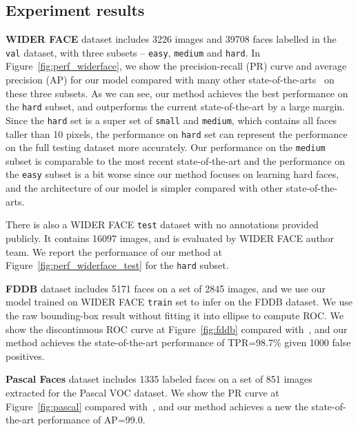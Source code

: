 \documentclass[10pt,twocolumn,letterpaper]{article}
\begin{document}
\subsection{Experiment results}
\vspace{1ex}\noindent \textbf{WIDER FACE}
dataset includes 3226 images and 39708 faces labelled in the \texttt{val} dataset, with three subsets --
\texttt{easy}, \texttt{medium} and \texttt{hard}. In Figure~\ref{fig:perf_widerface}, we show the precision-recall (PR) curve and average precision (AP) for
our model compared with many other state-of-the-arts~\cite{BaiFindingTF,cai2016unified,najibi2017ssh,ohn2016boost,Tang_2018_ECCV,wang2017facercnn,wang2017face,wang2017detecting,wang2017rfcn,yang2014aggregate,yang2015facial,yang2016wider,yang2017face,zhang2018face,zhang2016joint,zhang2017s,zhu2018seeing,zhu2017cms} on these three subsets.
As we can see, our method achieves the best performance on the \texttt{hard} subset, and outperforms
the current state-of-the-art by a large margin.
Since the \texttt{hard} set is a super set of \texttt{small} and
\texttt{medium}, which contains all faces taller than 10 pixels, the performance
on \texttt{hard} set can represent the performance on the full testing
dataset more accurately.
Our performance on the \texttt{medium} subset is comparable to the
most recent state-of-the-art and the performance on the \texttt{easy} subset is a bit worse since our
method focuses on learning hard faces, and the architecture of our model
is simpler compared with other state-of-the-arts.

There is also a WIDER FACE \texttt{test} dataset with no annotations provided publicly. It contains 16097 images, and
is evaluated by WIDER FACE author team. We report the performance of our method at Figure~\ref{fig:perf_widerface_test} for the \texttt{hard} subset.

\vspace{1ex} \noindent \textbf{FDDB}
 dataset includes 5171 faces on a set of 2845 images, and we use our model trained on WIDER FACE \texttt{train} set to infer
on the FDDB dataset. We use the raw bounding-box result without fitting it into ellipse to
compute ROC.
We show the discontinuous ROC curve at Figure~\ref{fig:fddb} compared with~\cite{li2013learning,mathias2014face,shen2013detecting,Tang_2018_ECCV,viola2004robust,yan2014face,zhang2018face,zhang2017s,zhu2012face}, and our method achieves
the state-of-the-art performance of TPR=98.7\% given 1000 false positives.

\vspace{1ex} \noindent \textbf{Pascal Faces}
 dataset includes 1335 labeled faces on a set of 851 images extracted for the Pascal VOC dataset.
We show the PR curve at Figure~\ref{fig:pascal} compared with~\cite{mathias2014face,zhang2017s}, and our method achieves a new
the state-of-the-art performance of AP=99.0.
\end{document}

